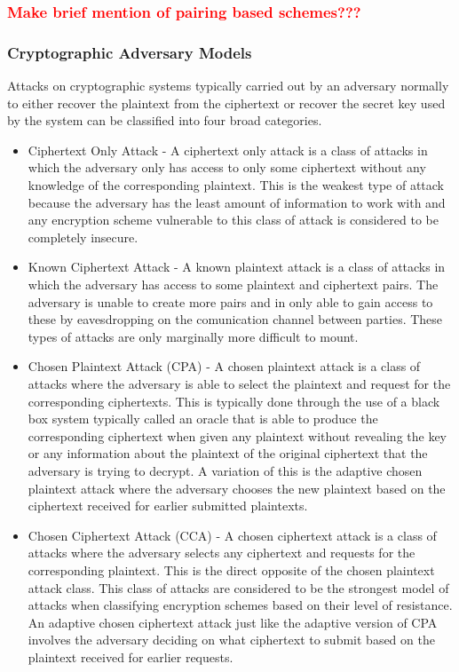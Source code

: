 \subsubsection*{\textcolor{red}{Make brief mention of pairing based schemes???}}

\subsubsection*{Cryptographic Adversary Models}

Attacks on cryptographic systems typically carried out by an adversary normally to either recover the plaintext from the ciphertext or recover the secret key used by the system can be classified into four broad categories.

\begin{itemize}
	\item Ciphertext Only Attack \cite{Menezes1996} - A ciphertext only attack is a class of attacks in which the adversary only has access to only some ciphertext without any knowledge of the corresponding plaintext. This is the weakest type of attack because the adversary has the least amount of information to work with and any encryption scheme vulnerable to this class of attack is considered to be completely insecure.
	
	\item Known Ciphertext Attack \cite{Menezes1996} - A known plaintext attack is a class of attacks in which the adversary has access to some plaintext and ciphertext pairs. The  adversary is unable to create more pairs and in only able to gain access to these by eavesdropping on the comunication channel between parties. These types of attacks are only marginally more difficult to mount. 
	
	\item Chosen Plaintext Attack (CPA) \cite{Menezes1996} - A chosen plaintext attack is a class of attacks where the adversary is able to select the plaintext and request for the corresponding ciphertexts. This is typically done through the use of a black box system typically called an oracle that is able to produce the corresponding ciphertext when given any plaintext without revealing the key or any information about the plaintext of the original ciphertext that the adversary is trying to decrypt. A variation of this is the adaptive chosen plaintext attack where the adversary chooses the new plaintext based on the ciphertext received for earlier submitted plaintexts.
	
	\item Chosen Ciphertext Attack (CCA) \cite{Menezes1996} - A chosen ciphertext attack is a class of attacks where the adversary selects any ciphertext and requests for the corresponding plaintext. This is the direct opposite of the chosen plaintext attack class. This class of attacks are considered to be the strongest model of attacks when classifying encryption schemes based on their level of resistance. An adaptive chosen ciphertext attack just like the adaptive version of CPA involves the adversary deciding on what ciphertext to submit based on the plaintext received for earlier requests.
	
\end{itemize}

